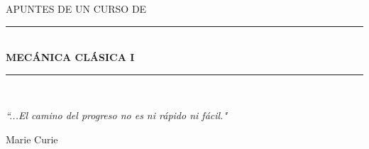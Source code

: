 \documentclass[12pt]{report}
\begin{document}



\begin{titlepage}

\begin{center}
\vspace*{-1in}
\begin{figure}[htb]
\begin{center}
\end{center}
\end{figure}


\vspace*{0.15in}

\vspace*{0.6in} 
\begin{large}
APUNTES DE UN CURSO DE 
\end{large}
\vspace*{0.2in}
\begin{Large}

\rule{120mm}{0.1mm}\\
\vspace*{0.3in}
\textbf{ MEC\'ANICA CL\'ASICA I} \\
\vspace*{0.2in}
\end{Large}
\vspace*{0.3in}



\rule{115mm}{0.1mm}\\
\vspace*{0.1in}
\vspace*{0.5in}

\begin{large}
\end{large}



\vspace*{4in}

\emph{\textquotedblleft ...El camino del progreso no es ni r\'apido ni f\'acil."}

\begin{flushright}
Marie Curie
\end{flushright}

\begin{large}

\end{large}
\end{center}

\end{titlepage}
\end{document}
